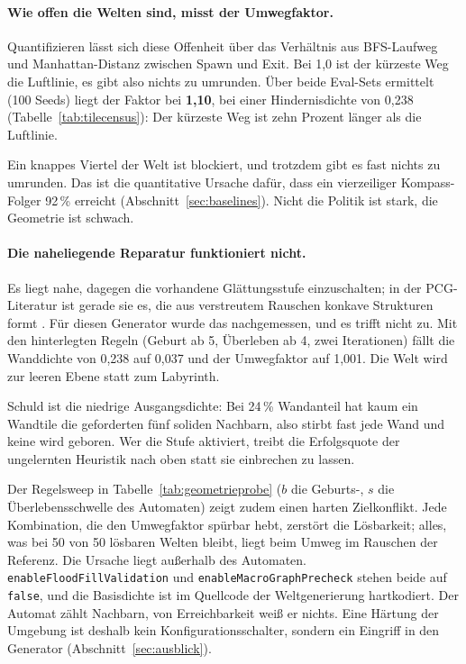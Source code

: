 \documentclass[11pt,a4paper]{article}
\begin{document}
\paragraph{Wie offen die Welten sind, misst der Umwegfaktor.}
Quantifizieren lässt sich diese Offenheit über das Verhältnis aus BFS-Laufweg
und Manhattan-Distanz zwischen Spawn und Exit. Bei 1,0 ist der kürzeste Weg die
Luftlinie, es gibt also nichts zu umrunden. Über beide Eval-Sets ermittelt
(100 Seeds) liegt der Faktor bei
\textbf{1,10}, bei einer Hindernisdichte von 0,238
(Tabelle~\ref{tab:tilecensus}): Der kürzeste Weg ist zehn Prozent
länger als die Luftlinie.

Ein knappes Viertel der Welt ist blockiert, und
trotzdem gibt es fast nichts zu umrunden. Das ist die quantitative Ursache dafür, dass ein
vierzeiliger Kompass-Folger 92\,\% erreicht (Abschnitt~\ref{sec:baselines}).
Nicht die Politik ist stark, die Geometrie ist schwach.

\paragraph{Die naheliegende Reparatur funktioniert nicht.}
Es liegt nahe, dagegen die vorhandene Glättungsstufe einzuschalten; in der
PCG-Literatur ist gerade sie es, die aus verstreutem Rauschen konkave
Strukturen formt \cite{johnson2010cellular, shaker2016pcg}. Für diesen
Generator wurde das nachgemessen, und es trifft nicht zu. Mit den
hinterlegten Regeln (Geburt ab 5, Überleben ab 4, zwei Iterationen) fällt die
Wanddichte von 0,238 auf 0,037 und der Umwegfaktor auf 1,001. Die Welt wird
zur leeren Ebene statt zum Labyrinth.

Schuld ist die niedrige Ausgangsdichte:
Bei 24\,\% Wandanteil hat kaum ein Wandtile die geforderten fünf soliden
Nachbarn, also stirbt fast jede Wand und keine wird geboren. Wer die Stufe
aktiviert, treibt die Erfolgsquote der ungelernten Heuristik nach oben statt
sie einbrechen zu lassen.

Der Regelsweep in Tabelle~\ref{tab:geometrieprobe} ($b$ die Geburts-, $s$ die
Überlebensschwelle des Automaten) zeigt zudem einen
harten Zielkonflikt. Jede Kombination, die den Umwegfaktor spürbar hebt,
zerstört die Lösbarkeit; alles, was bei 50 von 50 lösbaren Welten bleibt, liegt
beim Umweg im Rauschen der Referenz. Die Ursache liegt außerhalb des Automaten.
\texttt{enableFloodFillValidation} und \texttt{enableMacroGraphPrecheck} stehen
beide auf \texttt{false}, und die
Basisdichte ist im Quellcode der Weltgenerierung hartkodiert. Der Automat
zählt Nachbarn, von Erreichbarkeit weiß er nichts. Eine Härtung der Umgebung
ist deshalb kein Konfigurationsschalter, sondern ein Eingriff in den Generator
(Abschnitt~\ref{sec:ausblick}).
\end{document}
